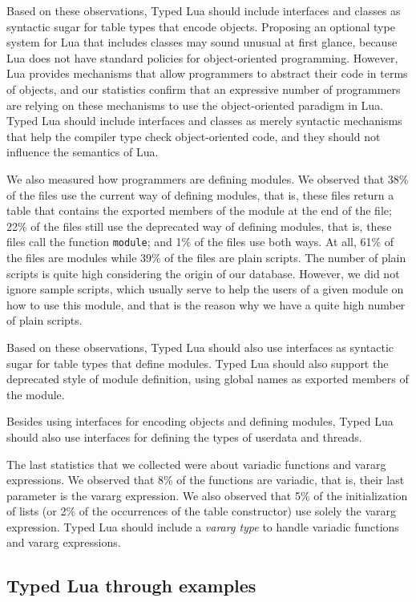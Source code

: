 \documentclass[preprint]{sig-alternate}
\begin{document}
Based on these observations, Typed Lua should include interfaces and
classes as syntactic sugar for table types that encode objects.
Proposing an optional type system for Lua that includes classes may
sound unusual at first glance, because Lua does not have standard
policies for object-oriented programming.
However, Lua provides mechanisms that allow programmers to abstract
their code in terms of objects, and our statistics confirm that
an expressive number of programmers are relying on these mechanisms to
use the object-oriented paradigm in Lua.
Typed Lua should include interfaces and classes as merely syntactic
mechanisms that help the compiler type check object-oriented code,
and they should not influence the semantics of Lua.

We also measured how programmers are defining modules.
We observed that 38\% of the files use the current way of defining
modules, that is, these files return a table that contains the
exported members of the module at the end of the file;
22\% of the files still use the deprecated way of defining modules,
that is, these files call the function \verb'module';
and 1\% of the files use both ways.
At all, 61\% of the files are modules while 39\% of the files are
plain scripts.
The number of plain scripts is quite high considering the origin of
our database.
However, we did not ignore sample scripts, which usually serve to
help the users of a given module on how to use this module, and
that is the reason why we have a quite high number of plain scripts.

Based on these observations, Typed Lua should also use interfaces as
syntactic sugar for table types that define modules.
Typed Lua should also support the deprecated style of module definition,
using global names as exported members of the module.

Besides using interfaces for encoding objects and defining modules,
Typed Lua should also use interfaces for defining the types of
userdata and threads.

The last statistics that we collected were about variadic functions
and vararg expressions.
We observed that 8\% of the functions are variadic, that is,
their last parameter is the vararg expression.
We also observed that 5\% of the initialization of lists
(or 2\% of the occurrences of the table constructor) use solely the
vararg expression.
Typed Lua should include a \textit{vararg type} to handle variadic
functions and vararg expressions.

\subsection{Typed Lua through examples}
\end{document}
